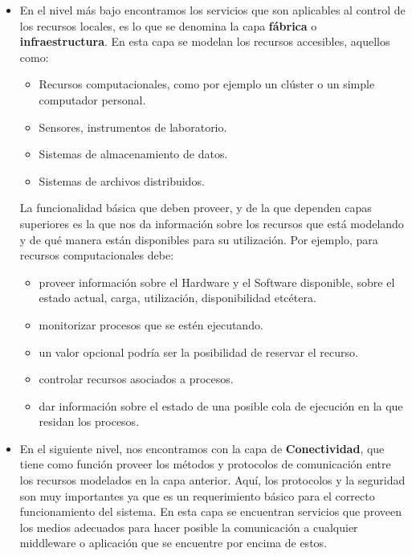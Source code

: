 \begin{itemize}
 \item  En el nivel más bajo encontramos los servicios que son aplicables al control de los recursos locales, es lo que se denomina la capa \textbf{fábrica} o \textbf{infraestructura}.
 En esta capa se modelan los recursos accesibles, aquellos como:

      \begin{itemize}
      \item Recursos computacionales, como por ejemplo un clúster o un simple computador personal.
      \item Sensores, instrumentos de laboratorio.
      \item Sistemas de almacenamiento de datos.
      \item Sistemas de archivos distribuidos.
      \end{itemize}

      La funcionalidad básica que deben proveer, y de la que dependen capas superiores es la que nos da información sobre los recursos que está 
      modelando y de qué manera están disponibles para su utilización. Por ejemplo, para recursos computacionales debe:

      \begin{itemize}
      \item proveer información sobre el Hardware y el Software disponible, sobre el estado actual, carga, utilización, disponibilidad etcétera.
      \item monitorizar procesos que se estén ejecutando.
      \item un valor opcional podría ser la posibilidad de reservar el recurso.
      \item controlar recursos asociados a procesos.
      \item dar información sobre el estado de una posible cola de ejecución en la que residan los procesos.
      \end{itemize}

\item  En el siguiente nivel, nos encontramos con la capa de \textbf{Conectividad}, que tiene como función proveer los métodos y protocolos de comunicación entre los 
recursos modelados en la capa anterior. Aquí, los protocolos y la seguridad son muy importantes ya que es un requerimiento básico para el correcto funcionamiento del sistema. 
En esta capa se encuentran servicios que proveen los medios adecuados para hacer posible la comunicación a cualquier middleware o aplicación que se encuentre por encima de estos.


\end{itemize}

